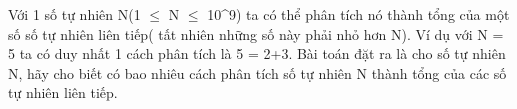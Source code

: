 Với 1 số tự nhiên N(1 $\le$  N  $\le$  10^9) ta có thể phân tích nó thành tổng của một số số tự nhiên liên tiếp( tất nhiên những số này phải nhỏ hơn N). Ví dụ với N = 5 ta có duy nhất 1 cách phân tích là 5 = 2+3.      Bài toán đặt ra là cho số tự nhiên N, hãy cho biết có bao nhiêu cách phân tích số tự nhiên N thành tổng của các số tự nhiên liên tiếp.